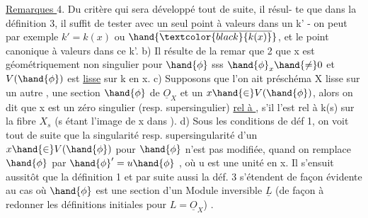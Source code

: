 
\uline{Remarques }4.  Du  critère qui sera développé tout de suite, il résul-%
te que dans la définition 3, il suffit de tester avec un seul point
à valeurs dans un k' - on peut par exemple  $k'=k(x)$ ou $\hand{\overline{\textcolor{black}{k(x)}}}$, et
le point canonique à valeurs dans ce k'. b) Il résulte de la remar
que 2 que x est géométriquement non singulier pour $\hand{\phi}$ sss $\hand{\phi}_x \hand{\neq} 0$ et
$V(\hand{\phi})$ est \uline{lisse} sur k en x. c) Supposons que l'on ait  préschéma X lisse
sur un autre , une section $\hand{\phi}$ de $\underline{O}_X$ et un $x \hand{\in} V(\hand{\phi})$, alors on dit que x
est un zéro singulier (resp. supersingulier) \uline{rel à }, s'il l'est
rel à k(s) sur la fibre $X_s$ (s étant l'image de x dans ). d) Sous
les conditions de déf 1, on voit tout de suite que la singularité resp.
 supersingularité d'un $x \hand{\in} V(\hand{\phi})$ pour $\hand{\phi}$ n'est pas modifiée, quand on
remplace $\hand{\phi}$ par $\hand{\phi}'=u\hand{\phi}$ , où u est une unité en x. Il s'ensuit aussitôt que
la  définition 1 et par suite aussi la déf. 3 s'étendent de façon
évidente au cas où $\hand{\phi}$ est une section d'un Module inversible $\underline{L}$ (de façon
à redonner les définitions initiales pour $L = \underline{O}_X$) .

